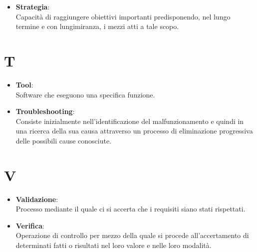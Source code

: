 \documentclass[a4paper, oneside, openany, dvipsnames, table]{article}
\begin{document}
\begin{itemize}
\item \textbf{Strategia}:\\	Capacità di raggiungere obiettivi importanti predisponendo, nel lungo termine e con lungimiranza, i mezzi atti a tale scopo.
\end{itemize}


\newpage
\section{T}
\begin{itemize}
\item \textbf{Tool}:\\	Software che eseguono una specifica funzione.
\end{itemize}

\begin{itemize}
\item \textbf{Troubleshooting}:\\	Consiste inizialmente nell'identificazione del malfunzionamento e quindi in una ricerca della sua causa attraverso un processo di eliminazione progressiva delle possibili cause conosciute.
\end{itemize}

\newpage
\section{V}
\begin{itemize}
\item \textbf{Validazione}:\\	Processo mediante il quale ci si accerta che i requisiti siano stati rispettati.
\end{itemize}

\begin{itemize}
\item \textbf{Verifica}:\\	Operazione di controllo per mezzo della quale si procede all'accertamento di determinati fatti o risultati nel loro valore e nelle loro modalità.
\end{itemize}
\end{document}
